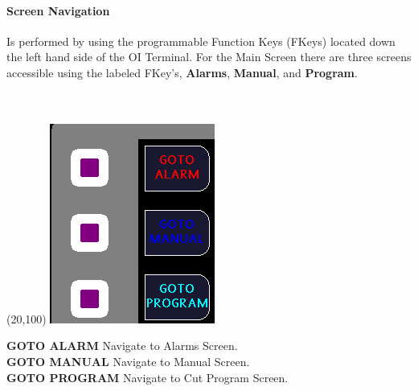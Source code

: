 \paragraph{Screen Navigation}Is performed by using the programmable Function Keys (FKeys) located down the left hand side of the OI Terminal. For the Main Screen there are three screens accessible using the labeled FKey's, \textbf{Alarms}, \textbf{Manual}, and \textbf{Program}.
\\
\\
\\
\begin{minipage}{5cm}
	\begin{picture}(20,100)
	\includegraphics[width=.5\linewidth]{screen-captures/main-nav}
	\end{picture}
\end{minipage}\begin{minipage}[]{15cm}
	\textbf{GOTO ALARM} Navigate to Alarms Screen.
	\\
	\textbf{GOTO MANUAL} Navigate to Manual Screen.
	\\
	\textbf{GOTO PROGRAM} Navigate to Cut Program Screen.
\end{minipage}
\\
